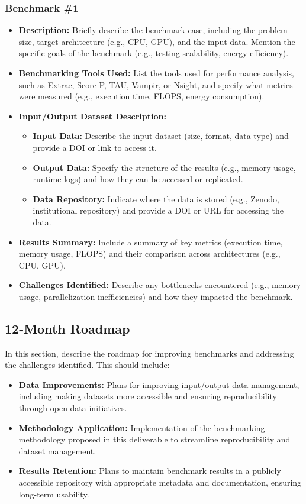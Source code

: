 \subsubsection{Benchmark \#1}
\begin{itemize}
    \item \textbf{Description:} Briefly describe the benchmark case, including the problem size, target architecture (e.g., CPU, GPU), and the input data. Mention the specific goals of the benchmark (e.g., testing scalability, energy efficiency).
    \item \textbf{Benchmarking Tools Used:} List the tools used for performance analysis, such as Extrae, Score-P, TAU, Vampir, or Nsight, and specify what metrics were measured (e.g., execution time, FLOPS, energy consumption).
    \item \textbf{Input/Output Dataset Description:}
        \begin{itemize}
            \item \textbf{Input Data:} Describe the input dataset (size, format, data type) and provide a DOI or link to access it.
            \item \textbf{Output Data:} Specify the structure of the results (e.g., memory usage, runtime logs) and how they can be accessed or replicated.
            \item \textbf{Data Repository:} Indicate where the data is stored (e.g., Zenodo, institutional repository) and provide a DOI or URL for accessing the data.
        \end{itemize}
    \item \textbf{Results Summary:} Include a summary of key metrics (execution time, memory usage, FLOPS) and their comparison across architectures (e.g., CPU, GPU).
    \item \textbf{Challenges Identified:} Describe any bottlenecks encountered (e.g., memory usage, parallelization inefficiencies) and how they impacted the benchmark.
\end{itemize}

\subsection{12-Month Roadmap}
\label{sec:WP3:HPDDM:roadmap}

In this section, describe the roadmap for improving benchmarks and addressing the challenges identified. This should include:
\begin{itemize}
    \item \textbf{Data Improvements:} Plans for improving input/output data management, including making datasets more accessible and ensuring reproducibility through open data initiatives.
    \item \textbf{Methodology Application:} Implementation of the benchmarking methodology proposed in this deliverable to streamline reproducibility and dataset management.
    \item \textbf{Results Retention:} Plans to maintain benchmark results in a publicly accessible repository with appropriate metadata and documentation, ensuring long-term usability.
\end{itemize}